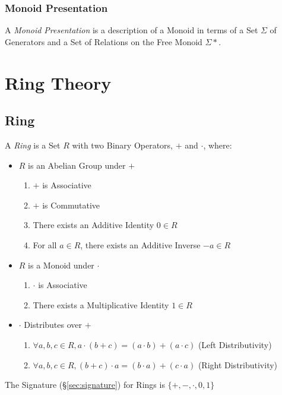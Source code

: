 \subsubsection{Monoid Presentation}\label{sec:monoid_presentation}

A \emph{Monoid Presentation} is a description of a Monoid in terms of
a Set $\Sigma$ of Generators and a Set of Relations on the Free Monoid
$\Sigma*$.



\section{Ring Theory}\label{sec:ring_theory}

\subsection{Ring}\label{sec:ring}

A \emph{Ring} is a Set $R$ with two Binary Operators, $+$ and
$\cdot$, where:

\begin{itemize}
\item $R$ is an Abelian Group under $+$
    \begin{enumerate}
        \item $+$ is Associative
        \item $+$ is Commutative
        \item There exists an Additive Identity $0 \in R$
        \item For all $a \in R$, there exists an Additive Inverse $-a
          \in R$
    \end{enumerate}
\item $R$ is a Monoid under $\cdot$
    \begin{enumerate}
        \item $\cdot$ is Associative
        \item There exists a Multiplicative Identity $1 \in R$
    \end{enumerate}
\item $\cdot$ Distributes over $+$
    \begin{enumerate}
        \item $\forall a,b,c \in R,
            a \cdot (b + c) = (a \cdot b) + (a \cdot c)$
            (Left Distributivity)
        \item $\forall a,b,c \in R,
            (b + c) \cdot a = (b \cdot a) + (c \cdot a)$
            (Right Distributivity)
    \end{enumerate}
\end{itemize}
The Signature (\S\ref{sec:signature}) for Rings is $\{+, -, \cdot, 0,
1\}$


